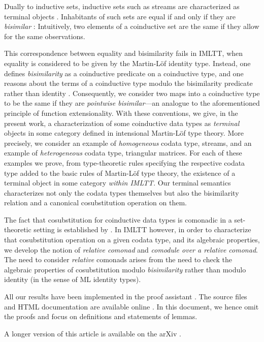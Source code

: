 \documentclass[envcountsame]{llncs}
\begin{document}
 Dually to inductive sets, inductive sets such as streams are characterized as terminal objects \parencite{jacobs1997tutorial}.
 Inhabitants of such sets are equal if and only if they are \emph{bisimilar} \parencite{DBLP:journals/mscs/TuriR98}:
 Intuitively, two elements of a coinductive set are the same if they allow for the same observations.
 
 This correspondence between equality and bisimilarity fails in IMLTT, when equality is considered to be given by the 
 Martin-L\"of identity type. Instead, one defines \emph{bisimilarity} as a coinductive predicate 
 on a coinductive type, and one reasons about the terms of a coinductive type modulo the bisimilarity predicate
 rather than identity \parencite{DBLP:conf/types/Coquand93}.
 Consequently, we consider two maps into a coinductive type to be the same if they are \emph{pointwise bisimilar}---an analogue
 to the aforementioned principle of function extensionality. 
 With these conventions, we give, in the present work, a characterization of some coinductive data types as \emph{terminal} objects in some category 
 defined in intensional Martin-L\"of type theory.
 More precisely, we consider an example of \emph{homogeneous} codata type, streams, and 
 an example of \emph{heterogeneous} codata type, triangular matrices.
 For each of these examples we prove, 
 from type-theoretic rules specifying the respective codata type added to the basic rules of Martin-L\"of type theory,
 the existence of a terminal object in some category \emph{within IMLTT}.
 Our terminal semantics characterizes not only the codata types themselves but also the bisimilarity relation and
 a canonical cosubstitution operation on them.
 
 The fact that cosubstitution for coinductive data types is comonadic in a set-theoretic setting is established by \textcite{DBLP:conf/sfp/UustaluV01}.
 In IMLTT however, in order to characterize that cosubstitution operation on a given codata type, and its algebraic properties,
 we develop the notion of \emph{relative comonad} and \emph{comodule over a relative comonad}.
 The need to consider \emph{relative} comonads arises from the  need to check the algebraic properties of cosubstitution modulo \emph{bisimilarity} rather
 than modulo identity (in the sense of ML identity types).
 
 
 All our results have been implemented in the proof assistant \coq \parencite{coq84pl3}.
 The \coq source files and HTML documentation are available online \parencite{trimat_coq}.
 In this document, we hence omit the proofs and focus on definitions and statements of lemmas.
\begin{Short}
 A longer version of this article is available on the arXiv \parencite{trimat_coq}.
\end{Short}
\end{document}
